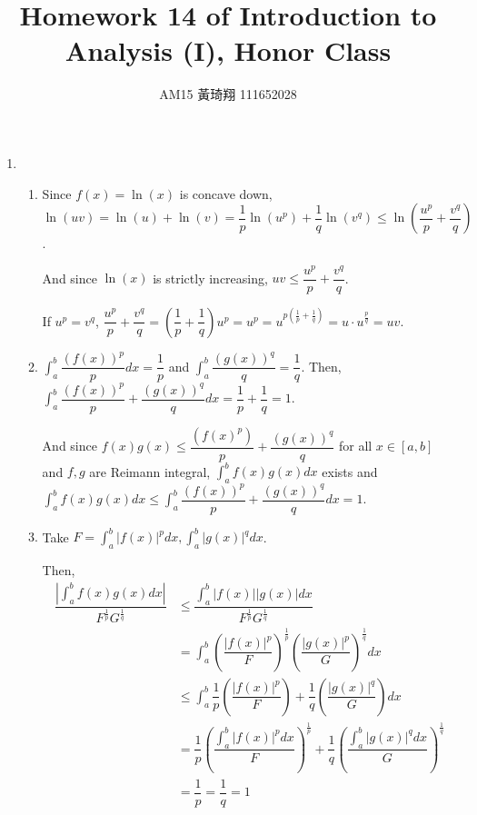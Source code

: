 \documentclass[12pt]{article}
\title{Homework 14 of Introduction to Analysis (I), Honor Class}
\author{AM15 黃琦翔 111652028}
\begin{document}
\maketitle
\begin{enumerate}
    \item \begin{enumerate}
        \item Since $f(x) = \ln(x)$ is concave down, $\ln(uv) = \ln(u) + \ln(v) = \dfrac{1}{p}\ln(u^p) + \dfrac{1}{q}\ln(v^q) \leq \ln(\dfrac{u^p}{p} + \dfrac{v^q}{q})$.
        
        And since $\ln(x)$ is strictly increasing, $uv \leq \dfrac{u^p}{p} + \dfrac{v^q}{q}$.

        If $u^p = v^q$, $\dfrac{u^p}{p} + \dfrac{v^q}{q} = (\dfrac{1}{p} + \dfrac{1}{q}) u^p = u^p = u^{p(\frac{1}{p} + \frac{1}{q})} = u\cdot u^{\frac{p}{q}} = uv$.

        \item $\displaystyle\int_a^b \dfrac{(f(x))^p}{p} dx= \dfrac{1}{p}$ and $\displaystyle\int_a^b \dfrac{(g(x))^q}{q} = \dfrac{1}{q}$.
        Then, $\displaystyle\int_a^b \dfrac{(f(x))^p}{p} + \dfrac{(g(x))^q}{q} dx = \dfrac{1}{p} + \dfrac{1}{q} = 1$.

        And since $f(x)g(x) \leq \dfrac{(f(x)^p)}{p} + \dfrac{(g(x))^q}{q}$ for all $x\in [a, b]$ and $f, g$ are Reimann integral,
        $\displaystyle\int_a^b f(x)g(x) dx$ exists and $\displaystyle\int_a^b f(x) g(x) dx \leq \displaystyle\int_a^b \dfrac{(f(x))^p}{p} + \dfrac{(g(x))^q}{q} dx = 1$.

        \item Take $F = \displaystyle\int_a^b |f(x)|^p dx, \displaystyle\int_a^b |g(x)|^q dx$.
        
        Then, \begin{align*}
            \dfrac{|\int_a^b f(x)g(x) dx|}{F^{\frac{1}{p}}G^{\frac{1}{q}}} &\leq \dfrac{\int_a^b |f(x)||g(x)| dx}{F^\frac{1}{p}G^{\frac{1}{q}}}\\
            &= \int_a^b (\dfrac{|f(x)|^p}{F})^{\frac{1}{p}} (\dfrac{|g(x)|^p}{G})^{\frac{1}{q}} dx\\
            &\leq \int_a^b \dfrac{1}{p}(\dfrac{|f(x)|^p}{F})+ \dfrac{1}{q}(\dfrac{|g(x)|^q}{G}) dx\\
            &=\dfrac{1}{p} (\dfrac{\int_a^b |f(x)|^p dx}{F})^{\frac{1}{p}} + \dfrac{1}{q}(\dfrac{\int_a^b |g(x)|^q dx}{G})^{\frac{1}{q}}\\
            &= \dfrac{1}{p} = \dfrac{1}{q} = 1
        \end{align*}


\end{enumerate}
\end{enumerate}
\end{document}
